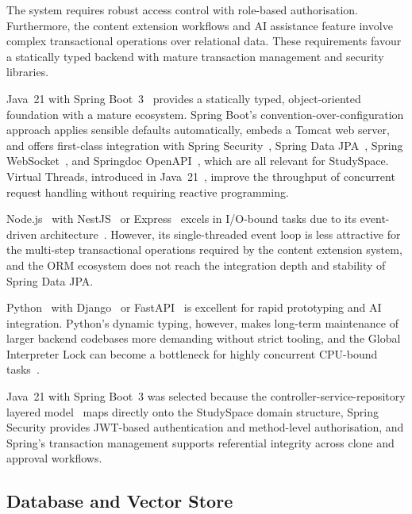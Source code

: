 The system requires robust access control with role-based authorisation. Furthermore, the content extension workflows and AI assistance feature involve complex transactional operations over relational data. These requirements favour a statically typed backend with mature transaction management and security libraries.

Java~21 with Spring Boot~3~\cite{Java21,SpringBoot} provides a statically typed, object-oriented foundation with a mature ecosystem. Spring Boot's convention-over-configuration approach applies sensible defaults automatically, embeds a Tomcat web server, and offers first-class integration with Spring Security~\cite{SpringSecurity}, Spring Data JPA~\cite{SpringDataJPA}, Spring WebSocket~\cite{SpringWebSocket}, and Springdoc OpenAPI~\cite{SpringdocOpenAPI}, which are all relevant for StudySpace. Virtual Threads, introduced in Java~21~\cite{VirtualThreadsJEP444}, improve the throughput of concurrent request handling without requiring reactive programming.

Node.js~\cite{Nodejs} with NestJS~\cite{NestJS} or Express~\cite{ExpressJS} excels in I/O-bound tasks due to its event-driven architecture~\cite{NodejsAbout}. However, its single-threaded event loop is less attractive for the multi-step transactional operations required by the content extension system, and the ORM ecosystem does not reach the integration depth and stability of Spring Data JPA.

Python~\cite{Python} with Django~\cite{Django} or FastAPI~\cite{FastAPI} is excellent for rapid prototyping and AI integration. Python's dynamic typing, however, makes long-term maintenance of larger backend codebases more demanding without strict tooling, and the Global Interpreter Lock can become a bottleneck for highly concurrent CPU-bound tasks~\cite{PythonGIL}.

Java~21 with Spring Boot~3 was selected because the controller-service-repository layered model~\cite{FowlerEAA,RichardsSAP} maps directly onto the StudySpace domain structure, Spring Security provides JWT-based authentication and method-level authorisation, and Spring's transaction management supports referential integrity across clone and approval workflows.

\subsection{Database and Vector Store}
\label{subsec:database-tech}

